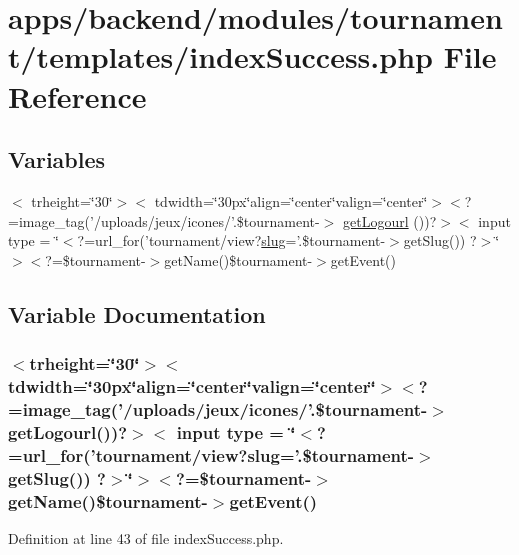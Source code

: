 \hypertarget{backend_2modules_2tournament_2templates_2index_success_8php}{\section{apps/backend/modules/tournament/templates/index\-Success.php File Reference}
\label{backend_2modules_2tournament_2templates_2index_success_8php}
}
\subsection*{Variables}
\begin{DoxyCompactItemize}
\item 
$<$ trheight=\char`\"{}30\char`\"{}$>$$<$ tdwidth=\char`\"{}30px\char`\"{}align=\char`\"{}center\char`\"{}valign=\char`\"{}center\char`\"{}$>$$<$?=image\-\_\-tag('/uploads/jeux/icones/'.\$tournament-\/$>$ \hyperlink{backend_2modules_2tournament_2templates_2index_success_8php_a35941bec2f3cf7beef9b8010a1342325}{get\-Logourl} ())?$>$$<$ input type = \char`\"{}$<$?=url\-\_\-for('tournament/view?\hyperlink{backend_2modules_2ipn_2templates_2view_success_8php_a2b7d6694be020169de3a660b1b93a40d}{slug}='.\$tournament-\/$>$get\-Slug()) ?$>$\char`\"{}$>$$<$?=\$tournament-\/$>$get\-Name()\$tournament-\/$>$get\-Event()
\end{DoxyCompactItemize}


\subsection{Variable Documentation}
\hypertarget{backend_2modules_2tournament_2templates_2index_success_8php_a35941bec2f3cf7beef9b8010a1342325}{
\subsubsection[{get\-Logourl}]{\setlength{\rightskip}{0pt plus 5cm}$<$trheight=\char`\"{}30\char`\"{}$>$$<$tdwidth=\char`\"{}30px\char`\"{}align=\char`\"{}center\char`\"{}valign=\char`\"{}center\char`\"{}$>$$<$?=image\-\_\-tag('/uploads/jeux/icones/'.\$tournament-\/$>$ get\-Logourl())?$>$$<$ input type = \char`\"{}$<$?=url\-\_\-for('tournament/view?{\bf slug}='.\$tournament-\/$>$get\-Slug()) ?$>$\char`\"{}$>$$<$?=\$tournament-\/$>$get\-Name()\$tournament-\/$>$get\-Event()}}\label{backend_2modules_2tournament_2templates_2index_success_8php_a35941bec2f3cf7beef9b8010a1342325}


Definition at line 43 of file index\-Success.\-php.

